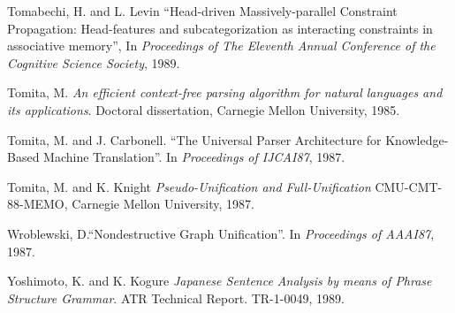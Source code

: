 \begin{thebibliography}{References}
 Tomabechi, H. and L. Levin
``Head-driven Massively-parallel Constraint Propagation:
Head-features and subcategorization as interacting constraints
in associative memory'', 
In {\it Proceedings of The Eleventh Annual Conference of 
the Cognitive Science Society}, 1989.




Tomita, M.
{\it An efficient context-free parsing algorithm for natural languages
and its applications}. Doctoral dissertation, Carnegie Mellon
University, 1985.


Tomita, M. and J. Carbonell.
``The Universal Parser Architecture for Knowledge-Based
Machine Translation''. In {\it Proceedings of IJCAI87},
1987.

Tomita, M. and K. Knight
{\it Pseudo-Unification and Full-Unification}
CMU-CMT-88-MEMO, Carnegie Mellon University, 1987.


Wroblewski, D.``Nondestructive Graph Unification''.
In {\it Proceedings of AAAI87}, 1987.


 Yoshimoto, K. and K. Kogure
{\it Japanese Sentence Analysis
by means of Phrase Structure Grammar}.   ATR Technical
Report. TR-1-0049, 1989.


\end{thebibliography}



























